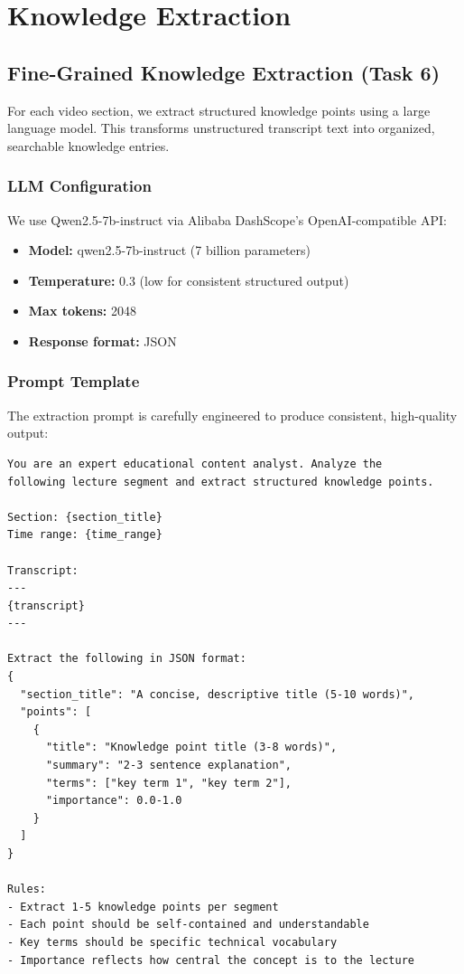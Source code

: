 \section{Knowledge Extraction}
\label{sec:knowledge}

\subsection{Fine-Grained Knowledge Extraction (Task 6)}

For each video section, we extract structured knowledge points using a large language model. This transforms unstructured transcript text into organized, searchable knowledge entries.

\subsubsection{LLM Configuration}

We use Qwen2.5-7b-instruct via Alibaba DashScope's OpenAI-compatible API:

\begin{itemize}
    \item \textbf{Model:} qwen2.5-7b-instruct (7 billion parameters)
    \item \textbf{Temperature:} 0.3 (low for consistent structured output)
    \item \textbf{Max tokens:} 2048
    \item \textbf{Response format:} JSON
\end{itemize}

\subsubsection{Prompt Template}

The extraction prompt is carefully engineered to produce consistent, high-quality output:

\begin{lstlisting}[language=text, caption={Fine-Grained Extraction Prompt}]
You are an expert educational content analyst. Analyze the 
following lecture segment and extract structured knowledge points.

Section: {section_title}
Time range: {time_range}

Transcript:
---
{transcript}
---

Extract the following in JSON format:
{
  "section_title": "A concise, descriptive title (5-10 words)",
  "points": [
    {
      "title": "Knowledge point title (3-8 words)",
      "summary": "2-3 sentence explanation",
      "terms": ["key term 1", "key term 2"],
      "importance": 0.0-1.0
    }
  ]
}

Rules:
- Extract 1-5 knowledge points per segment
- Each point should be self-contained and understandable
- Key terms should be specific technical vocabulary
- Importance reflects how central the concept is to the lecture
\end{lstlisting}

